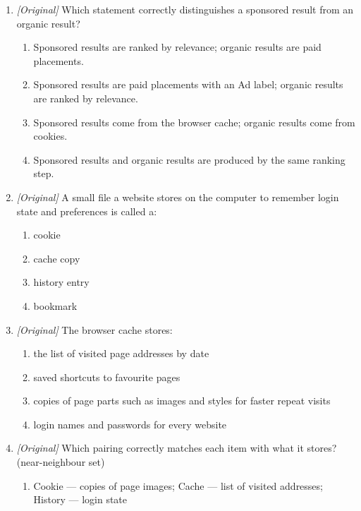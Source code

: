 \begin{enumerate}[label=\textbf{Q\arabic*.}, leftmargin=*]
\begin{enumerate}[label=\Alph*.]
    \item an advertiser paid for the placement
    \item it was visited most recently
    \item it is stored in the browser cache
  \end{enumerate}
\item \textit{[Original]} Which statement correctly distinguishes a sponsored
  result from an organic result?
  \begin{enumerate}[label=\Alph*.]
    \item Sponsored results are ranked by relevance; organic results are paid placements.
    \item Sponsored results are paid placements with an Ad label; organic results are ranked by relevance.
    \item Sponsored results come from the browser cache; organic results come from cookies.
    \item Sponsored results and organic results are produced by the same ranking step.
  \end{enumerate}
\item \textit{[Original]} A small file a website stores on the computer to
  remember login state and preferences is called a:
  \begin{enumerate}[label=\Alph*.]
    \item cookie
    \item cache copy
    \item history entry
    \item bookmark
  \end{enumerate}
\item \textit{[Original]} The browser cache stores:
  \begin{enumerate}[label=\Alph*.]
    \item the list of visited page addresses by date
    \item saved shortcuts to favourite pages
    \item copies of page parts such as images and styles for faster repeat visits
    \item login names and passwords for every website
  \end{enumerate}
\item \textit{[Original]} Which pairing correctly matches each item with what
  it stores? (near-neighbour set)
  \begin{enumerate}[label=\Alph*.]
    \item Cookie --- copies of page images; Cache --- list of visited addresses; History --- login state

\end{enumerate}
\end{enumerate}
